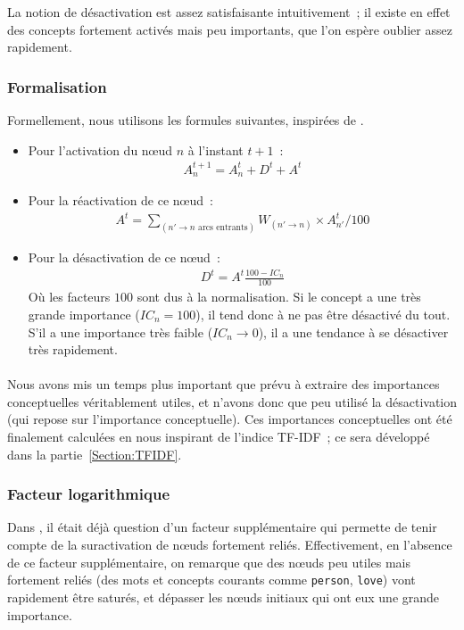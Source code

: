 \documentclass[a4paper, 12pt]{article}
\begin{document}
La notion de désactivation est assez satisfaisante intuitivement~; il existe en effet des concepts fortement activés mais peu importants, que l'on espère oublier assez rapidement. 

\subsubsection{Formalisation}
Formellement, nous utilisons les formules suivantes, inspirées de \cite{parmentier_specification_1998}.

\begin{itemize}
  \item Pour l'activation du n\oe{}ud $n$ à l'instant $t+1$~:
\begin{align}
 A_n^{t+1} = A_n^t + D^t + A^t
\end{align}
\item Pour la réactivation de ce n\oe{}ud~:
\begin{align}
 A^t = \sum_{(n' \rightarrow n \text{\ arcs entrants})} W_{(n'\rightarrow  n)} \times A_{n'}^t / 100
\end{align}
\item Pour la désactivation de ce n\oe{}ud~:
\begin{align}
 D^t = A^t \frac{100- IC_n}{100}
\end{align}
Où les facteurs $100$ sont dus à la normalisation. Si le concept a une très grande importance ($IC_n = 100$), il tend donc à ne pas être désactivé du tout. S'il a une importance très faible ($IC_n \rightarrow 0$), il a une tendance à se désactiver très rapidement.
\end{itemize}

\paragraph{}
Nous avons mis un temps plus important que prévu à extraire des importances conceptuelles véritablement utiles, et n'avons donc que peu utilisé la désactivation (qui repose sur l'importance conceptuelle). Ces importances conceptuelles ont été finalement calculées en nous inspirant de l'indice TF-IDF~; ce sera développé dans la partie~\ref{Section:TFIDF}.

\subsubsection{Facteur logarithmique}
Dans \cite{parmentier_specification_1998}, il était déjà question d'un facteur supplémentaire qui permette de tenir compte de la suractivation de n\oe{}uds fortement reliés. Effectivement, en l'absence de ce facteur supplémentaire, on remarque que des n\oe{}uds peu utiles mais fortement reliés (des mots et concepts courants comme \verb|person|, \verb|love|) vont rapidement être saturés, et dépasser les n\oe{}uds initiaux qui ont eux une grande importance.
\end{document}
